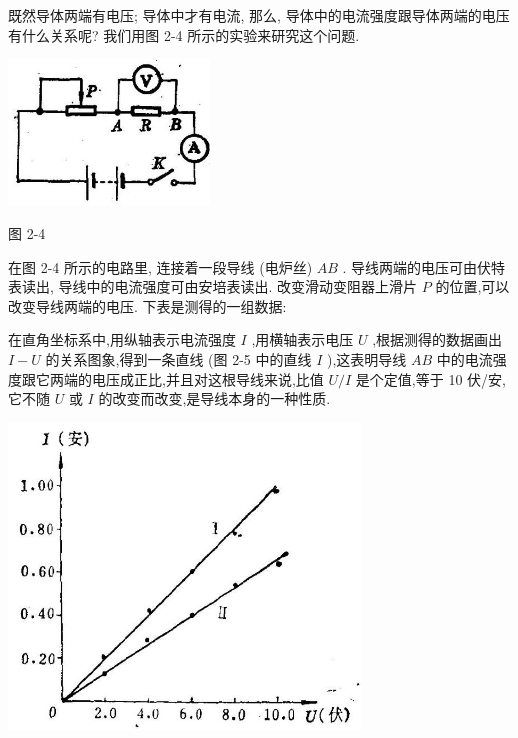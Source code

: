 \documentclass[10pt]{article}
\begin{document}
既然导体两端有电压; 导体中才有电流, 那么, 导体中的电流强度跟导体两端的电压有什么关系呢? 我们用图 2-4 所示的实验来研究这个问题.

\begin{center}
\includegraphics[max width=0.4\textwidth]{images/01913056-1f15-74d8-9184-9aab52c9d66b_61_558982.jpg}
\end{center}

图 2-4

在图 2-4 所示的电路里, 连接着一段导线 (电炉丝) \({AB}\) . 导线两端的电压可由伏特表读出, 导线中的电流强度可由安培表读出. 改变滑动变阻器上滑片 \(P\) 的位置,可以改变导线两端的电压. 下表是测得的一组数据:

\begin{center}
\end{center}

在直角坐标系中,用纵轴表示电流强度 \(I\) ,用横轴表示电压 \(U\) ,根据测得的数据画出 \(I - U\) 的关系图象,得到一条直线 (图 2-5 中的直线 \(I\) ),这表明导线 \({AB}\) 中的电流强度跟它两端的电压成正比,并且对这根导线来说,比值 \(U/I\) 是个定值,等于 10 伏/安,它不随 \(U\) 或 \(I\) 的改变而改变,是导线本身的一种性质.

\begin{center}
\includegraphics[max width=0.7\textwidth]{images/01913056-1f15-74d8-9184-9aab52c9d66b_62_750727.jpg}
\end{center}
\end{document}
